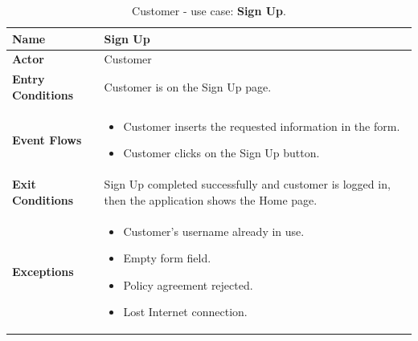 \begin{table}[H]
    \centering
    \begin{tabular}{| m{} | m{} |}
        \hline
        \textbf{Name}            & Sign Up                                                                                             \\
        \hline
        \textbf{Actor}            & Customer                                                                                            \\
        \hline
        \textbf{Entry Conditions} & Customer is on the Sign Up page.                                                                    \\
        \hline
        \textbf{Event Flows} &
        \begin{itemize}
            \item Customer inserts the requested information in the form.
            \item Customer clicks on the Sign Up button.
        \end{itemize} \\
        \hline
        \textbf{Exit Conditions}  & Sign Up completed successfully and customer is logged in, then the application shows the Home page. \\
        \hline
        \textbf{Exceptions} &
        \begin{itemize}
            \item Customer's username already in use.
            \item Empty form field.
            \item Policy agreement rejected.
            \item Lost Internet connection.
        \end{itemize} \\
        \hline
    \end{tabular}
    \caption{Customer - use case: \textbf{Sign Up}.}
    \label{tableSignUp}
\end{table}

